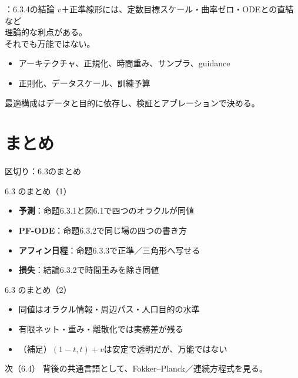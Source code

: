 \assuppl
\begin{frame}{\supplmark：6.3.4の結論}
    $v$＋正準線形には、定数目標スケール・曲率ゼロ・ODEとの直結など\\
    理論的な利点がある。\\
    それでも万能ではない。
    \begin{itemize}
        \item アーキテクチャ、正規化、時間重み、サンプラ、guidance
        \item 正則化、データスケール、訓練予算
    \end{itemize}
    最適構成はデータと目的に依存し、検証とアブレーションで決める。
\end{frame}
\section{まとめ}
\asmain
\begin{frame}{区切り：6.3のまとめ}
    \tableofcontents[currentsection]
\end{frame}
\asmain
\begin{frame}{6.3 のまとめ（1）}
    \begin{itemize}
        \item \textbf{予測}：命題6.3.1と図6.1で四つのオラクルが同値
        \item \textbf{PF-ODE}：命題6.3.2で同じ場の四つの書き方
        \item \textbf{アフィン日程}：命題6.3.3で正準／三角形へ写せる
        \item \textbf{損失}：結論6.3.2で時間重みを除き同値
    \end{itemize}
\end{frame}
\asmain
\begin{frame}{6.3 のまとめ（2）}
    \begin{itemize}
        \item 同値はオラクル情報・周辺パス・人口目的の水準
        \item 有限ネット・重み・離散化では実務差が残る
        \item （補足）$(1-t,t)+v$は安定で透明だが、万能ではない
    \end{itemize}
    \begin{block}{次（6.4）}
        背後の共通言語として、Fokker--Planck／連続方程式を見る。
    \end{block}
\end{frame}
